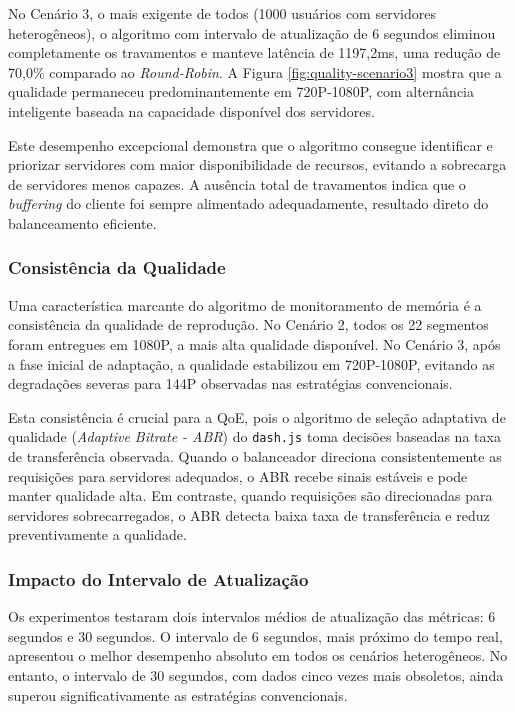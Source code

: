 No Cenário 3, o mais exigente de todos (1000 usuários com servidores heterogêneos), o algoritmo com intervalo de atualização de 6 segundos eliminou completamente os travamentos e manteve latência de 1197,2ms, uma redução de 70,0\% comparado ao \textit{Round-Robin}. A Figura \ref{fig:quality-scenario3} mostra que a qualidade permaneceu predominantemente em 720P-1080P, com alternância inteligente baseada na capacidade disponível dos servidores.

Este desempenho excepcional demonstra que o algoritmo consegue identificar e priorizar servidores com maior disponibilidade de recursos, evitando a sobrecarga de servidores menos capazes. A ausência total de travamentos indica que o \textit{buffering} do cliente foi sempre alimentado adequadamente, resultado direto do balanceamento eficiente.

\subsubsection{Consistência da Qualidade}

Uma característica marcante do algoritmo de monitoramento de memória é a consistência da qualidade de reprodução. No Cenário 2, todos os 22 segmentos foram entregues em 1080P, a mais alta qualidade disponível. No Cenário 3, após a fase inicial de adaptação, a qualidade estabilizou em 720P-1080P, evitando as degradações severas para 144P observadas nas estratégias convencionais.

Esta consistência é crucial para a QoE, pois o algoritmo de seleção adaptativa de qualidade (\textit{Adaptive Bitrate - ABR}) do \texttt{dash.js} toma decisões baseadas na taxa de transferência observada. Quando o balanceador direciona consistentemente as requisições para servidores adequados, o ABR recebe sinais estáveis e pode manter qualidade alta. Em contraste, quando requisições são direcionadas para servidores sobrecarregados, o ABR detecta baixa taxa de transferência e reduz preventivamente a qualidade.

\subsubsection{Impacto do Intervalo de Atualização}

Os experimentos testaram dois intervalos médios de atualização das métricas: 6 segundos e 30 segundos. O intervalo de 6 segundos, mais próximo do tempo real, apresentou o melhor desempenho absoluto em todos os cenários heterogêneos. No entanto, o intervalo de 30 segundos, com dados cinco vezes mais obsoletos, ainda superou significativamente as estratégias convencionais.

